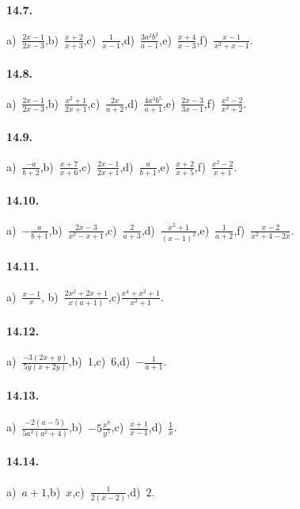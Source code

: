 \paragraph{14.7.}
a)~$\frac{2x-1}{2x-3}$,\quad b)~$\frac{x+2}{x+3}$,\quad c)~$\frac{1}{x-1}$,\quad d)~$\frac{3a^{2}b^{2}}{a-1}$,\quad e)~$\frac{x+4}{x-3}$,\quad f)~$\frac{x-1}{x^2+x-1}$.

\paragraph{14.8.}
a)~$\frac{2x-1}{2x-3}$,\quad b)~$\frac{x^2+1}{2x+1}$,\quad c)~$\frac{2x}{a+2}$,\quad d)~$\frac{4a^{3}b^{5}}{a+1}$,\quad e)~$\frac{2x-3}{3x-1}$,\quad f)~$\frac{x^2-2}{x^2+2}$.

\paragraph{14.9.}
a)~$\frac{-a}{b+2}$,\quad b)~$\frac{x+7}{x+6}$,\quad c)~$\frac{2x-1}{2x+1}$,\quad d)~$\frac{a}{b+1}$,\quad e)~$\frac{x+2}{x+5}$,\quad f)~$\frac{x^{2}-2}{x+1}$.

\paragraph{14.10.}
a)~$-\frac{a}{b+1}$,\quad b)~$\frac{2x-3}{x^2-x+1}$,\quad c)~$\frac{2}{a+3}$,\quad d)~$\frac{x^{2}+1}{(x-1)^2}$,\quad e)~$\frac{1}{a+2}$,\quad f)~$\frac{x-2}{x^2+4-2x}$.

\paragraph{14.11.}
a)~$\frac{x-1}{x}$, %
\quad b)~$\frac{2x^2+2x+1}{x(a+1)}$,\quad c)$\frac{x^{4}+x^{2}+1}{x^2+1}$.

\paragraph{14.12.}
a)~$\frac{-{3(2x+y)}}{5y(x+2y)}$,\quad b)~$1$,\quad c)~$6$,\quad d)~$-{\frac{1}{a+1}}$.

\paragraph{14.13.}
a)~$\frac{-{2(a-5)}}{5a^{2}(a^{2}+4)}$,\quad b)~$-5\frac{x^{8}}{y^{5}}$,\quad c)~$\frac{x+1}{x-1}$,\quad d)~$\frac{1}{x}$.

\paragraph{14.14.}
a)~$a+1$,\quad b)~$x$,\quad c)~$\frac{1}{2(x-2)}$,\quad d)~$2$.

